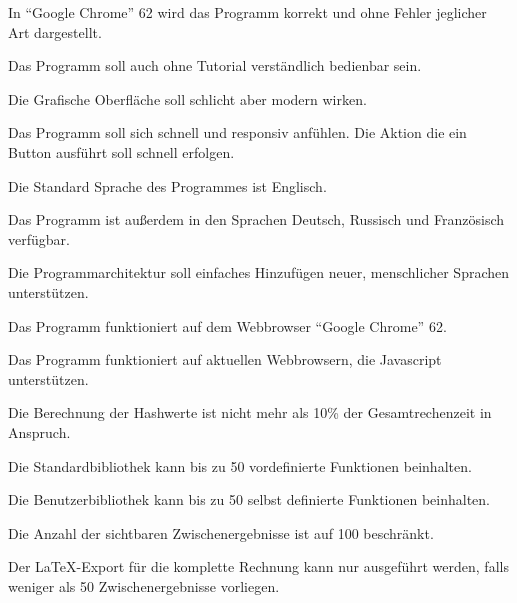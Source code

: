 \documentclass[parskip=full,11pt,twoside]{scrartcl}
\begin{document}
In \enquote{Google Chrome} 62 wird das Programm korrekt und ohne Fehler jeglicher Art dargestellt.

Das Programm soll auch ohne Tutorial verständlich bedienbar sein.

Die Grafische Oberfläche soll schlicht aber modern wirken.

Das Programm soll sich schnell und responsiv anfühlen. Die Aktion die ein Button ausführt soll schnell erfolgen.

Die Standard Sprache des Programmes ist Englisch.

Das Programm ist außerdem in den Sprachen Deutsch, Russisch und Französisch verfügbar.

Die Programmarchitektur soll einfaches Hinzufügen neuer, menschlicher Sprachen unterstützen.

Das Programm funktioniert auf dem Webbrowser \enquote{Google Chrome} 62.

Das Programm funktioniert auf aktuellen Webbrowsern, die Javascript unterstützen.

Die Berechnung der Hashwerte ist nicht mehr als 10\% der Gesamtrechenzeit in Anspruch.

Die Standardbibliothek kann bis zu 50 vordefinierte Funktionen beinhalten.

Die Benutzerbibliothek kann bis zu 50 selbst definierte Funktionen beinhalten.

Die Anzahl der sichtbaren Zwischenergebnisse ist auf 100 beschränkt.

Der LaTeX-Export für die komplette Rechnung kann nur ausgeführt werden, falls weniger als 50 Zwischenergebnisse vorliegen.
\end{document}
